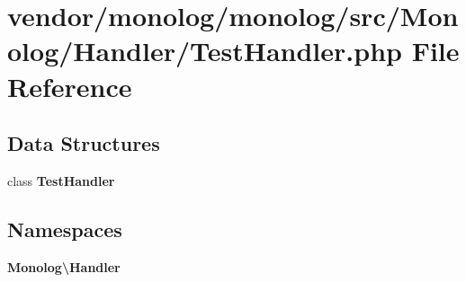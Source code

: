 \section{vendor/monolog/monolog/src/\+Monolog/\+Handler/\+Test\+Handler.php File Reference}
\label{_test_handler_8php}
\subsection*{Data Structures}
\begin{DoxyCompactItemize}
\item 
class {\bf Test\+Handler}
\end{DoxyCompactItemize}
\subsection*{Namespaces}
\begin{DoxyCompactItemize}
\item 
 {\bf Monolog\textbackslash{}\+Handler}
\end{DoxyCompactItemize}
